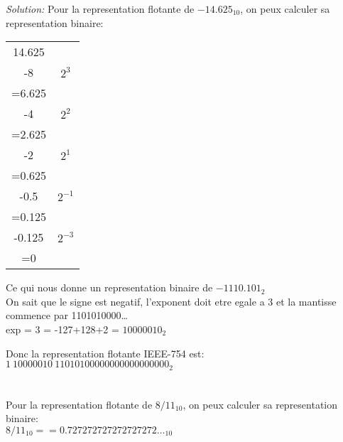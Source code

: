 \documentclass{article}
\newenvironment{solution}
    {\textit{Solution:}}
    {}
\begin{document}
\begin{solution}
    Pour la representation flotante de $-14.625_{10}$, on peux calculer sa representation binaire:\\
    \begin{tabular}{|c|c|}
        \hline
        14.625 \\
        -8 & $2^3$\\
        \hline
        =6.625 \\
        -4 & $2^2$\\ 
        \hline
        =2.625 \\ 
        -2 & $2^1$\\
        \hline
        =0.625\\ 
        -0.5 & $2^{-1}$\\ 
        \hline
        =0.125\\ 
        -0.125 & $2^{-3}$\\ 
        \hline
        =0\\ 
        \hline
    \end{tabular}
    Ce qui nous donne un representation binaire de $-1110.101_2$\\

    On sait que le signe est negatif, l'exponent doit etre egale a 3 et la mantisse commence par 1101010000\dots\\

    exp = 3 = -127+128+2 = $10000010_2$

    Donc la representation flotante IEEE-754 est: \\
    $1\ 10000010\ 11010100000000000000000_2$ \\\\\\

    Pour la representation flotante de $8/11_{10}$, on peux calculer sa representation binaire:\\
    $8/11_{10} == 0.727272727272727272\dots_{10}$


\end{solution}
\end{document}
